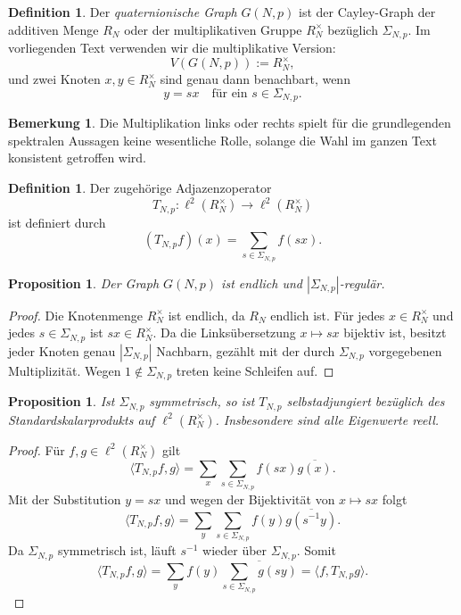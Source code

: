 \documentclass[12pt,a4paper]{article}
\newtheorem{proposition}[theorem]{Proposition}
\theoremstyle{definition}
\newtheorem{definition}[theorem]{Definition}
\newtheorem{remark}[theorem]{Bemerkung}
\begin{document}
	\begin{definition}
		Der \emph{quaternionische Graph} \(G(N,p)\) ist der Cayley-Graph der additiven Menge \(R_N\) oder der multiplikativen Gruppe \(R_N^\times\) bezüglich \(\Sigma_{N,p}\). Im vorliegenden Text verwenden wir die multiplikative Version:
		\[
		V(G(N,p)) := R_N^\times,
		\]
		und zwei Knoten \(x,y\in R_N^\times\) sind genau dann benachbart, wenn
		\[
		y = sx
		\quad\text{für ein } s\in \Sigma_{N,p}.
		\]
	\end{definition}
	
	\begin{remark}
		Die Multiplikation links oder rechts spielt für die grundlegenden spektralen Aussagen keine wesentliche Rolle, solange die Wahl im ganzen Text konsistent getroffen wird.
	\end{remark}
	
	\begin{definition}
		Der zugehörige Adjazenzoperator
		\[
		T_{N,p}\colon \ell^2(R_N^\times)\to \ell^2(R_N^\times)
		\]
		ist definiert durch
		\[
		(T_{N,p}f)(x)=\sum_{s\in\Sigma_{N,p}} f(sx).
		\]
	\end{definition}
	
	\begin{proposition}
		Der Graph \(G(N,p)\) ist endlich und \(|\Sigma_{N,p}|\)-regulär.
	\end{proposition}
	
	\begin{proof}
		Die Knotenmenge \(R_N^\times\) ist endlich, da \(R_N\) endlich ist. Für jedes \(x\in R_N^\times\) und jedes \(s\in\Sigma_{N,p}\) ist \(sx\in R_N^\times\). Da die Linksübersetzung \(x\mapsto sx\) bijektiv ist, besitzt jeder Knoten genau \(|\Sigma_{N,p}|\) Nachbarn, gezählt mit der durch \(\Sigma_{N,p}\) vorgegebenen Multiplizität. Wegen \(1\notin\Sigma_{N,p}\) treten keine Schleifen auf.
	\end{proof}
	
	\begin{proposition}
		Ist \(\Sigma_{N,p}\) symmetrisch, so ist \(T_{N,p}\) selbstadjungiert bezüglich des Standardskalarprodukts auf \(\ell^2(R_N^\times)\). Insbesondere sind alle Eigenwerte reell.
	\end{proposition}
	
	\begin{proof}
		Für \(f,g\in \ell^2(R_N^\times)\) gilt
		\[
		\langle T_{N,p}f,g\rangle
		=
		\sum_{x}\sum_{s\in\Sigma_{N,p}} f(sx)\overline{g(x)}.
		\]
		Mit der Substitution \(y=sx\) und wegen der Bijektivität von \(x\mapsto sx\) folgt
		\[
		\langle T_{N,p}f,g\rangle
		=
		\sum_{y}\sum_{s\in\Sigma_{N,p}} f(y)\overline{g(s^{-1}y)}.
		\]
		Da \(\Sigma_{N,p}\) symmetrisch ist, läuft \(s^{-1}\) wieder über \(\Sigma_{N,p}\). Somit
		\[
		\langle T_{N,p}f,g\rangle
		=
		\sum_{y} f(y)\overline{\sum_{s\in\Sigma_{N,p}} g(sy)}
		=
		\langle f,T_{N,p}g\rangle.
		\]
	\end{proof}
	
\end{document}
